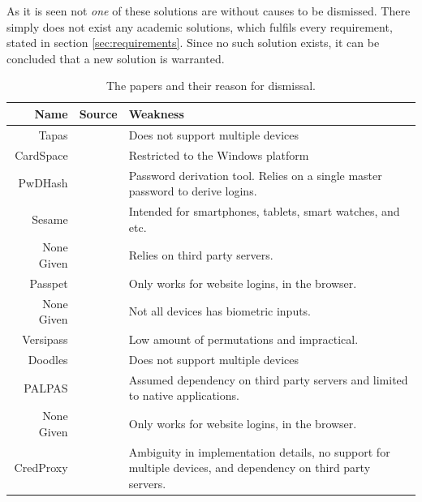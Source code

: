 			As it is seen not \emph{one} of these solutions are without causes to be dismissed. There simply does not exist any academic solutions, which fulfils every requirement, stated in section \ref{sec:requirements}. Since no such solution exists, it can be concluded that a new solution is warranted.

			\begin{table}
				\begin{tabular}{r | c |  p{6cm}}
					Name 					& Source 										& Weakness \\
					\hline
					Tapas 					& \cite{tapas} 									& Does not support multiple devices \\
					\hline
					CardSpace 				& \cite{cardspace, cardspace_impl} 				& Restricted to the Windows platform \\
					\hline
					PwDHash 				& \cite{pwdhash} 								& Password derivation tool. Relies on a single master password to derive logins. \\
					\hline
 					Sesame 					& \cite{sesame} 								& Intended for smartphones, tablets, smart watches, and etc. \\
					\hline
					None Given 				& \cite{browser_saved} 							& Relies on third party servers. \\
					\hline
					Passpet 				& \cite{passpet} 								& Only works for website logins, in the browser. \\
					\hline
					None Given 				& \cite{busch2014} 								& Not all devices has biometric inputs. \\
					\hline
					Versipass 				& \cite{stobert2014}  							& Low amount of permutations and impractical. \\
					\hline
					Doodles 				& \cite{doodles} 								& Does not support multiple devices \\
					\hline
					PALPAS 					& \cite{palpas} 								& Assumed dependency on third party servers and limited to native applications. \\
					\hline
					None Given 				& \cite{zhao2014} 								& Only works for website logins, in the browser. \\
					\hline
					CredProxy 				& \cite{golrang2012} 							& Ambiguity in implementation details, no support for multiple devices, and dependency on third party servers.\\
				\end{tabular}
				\caption{The papers and their reason for dismissal.}
				\label{tab:paper_dismiss}
			\end{table}



